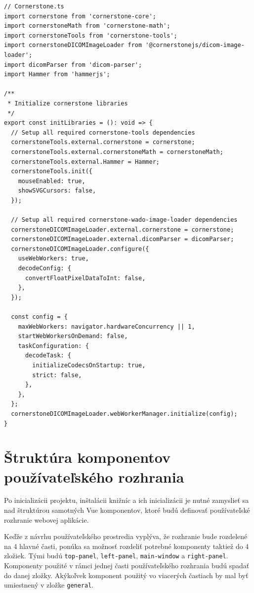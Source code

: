 \begin{minipage}[]{\linewidth}
\begin{verbatim}
// Cornerstone.ts
import cornerstone from 'cornerstone-core';
import cornerstoneMath from 'cornerstone-math';
import cornerstoneTools from 'cornerstone-tools';
import cornerstoneDICOMImageLoader from '@cornerstonejs/dicom-image-loader';
import dicomParser from 'dicom-parser';
import Hammer from 'hammerjs';

/**
 * Initialize cornerstone libraries
 */
export const initLibraries = (): void => {
  // Setup all required cornerstone-tools dependencies
  cornerstoneTools.external.cornerstone = cornerstone;
  cornerstoneTools.external.cornerstoneMath = cornerstoneMath;
  cornerstoneTools.external.Hammer = Hammer;
  cornerstoneTools.init({
    mouseEnabled: true,
    showSVGCursors: false,
  });

  // Setup all required cornerstone-wado-image-loader dependencies
  cornerstoneDICOMImageLoader.external.cornerstone = cornerstone;
  cornerstoneDICOMImageLoader.external.dicomParser = dicomParser;
  cornerstoneDICOMImageLoader.configure({
    useWebWorkers: true,
    decodeConfig: {
      convertFloatPixelDataToInt: false,
    },
  });

  const config = {
    maxWebWorkers: navigator.hardwareConcurrency || 1,
    startWebWorkersOnDemand: false,
    taskConfiguration: {
      decodeTask: {
        initializeCodecsOnStartup: true,
        strict: false,
      },
    },
  };
  cornerstoneDICOMImageLoader.webWorkerManager.initialize(config);
}
\end{verbatim}
\end{minipage}

\section {Štruktúra komponentov používateľského rozhrania}
Po inicializácii projektu, inštalácii knižníc a ich inicializácii je nutné zamyslieť sa nad štruktúrou samotných Vue komponentov, ktoré budú definovať používateľské rozhranie webovej aplikácie.

Keďže z návrhu používateľského prostredia vyplýva, že rozhranie bude rozdelené na 4 hlavné časti, ponúka sa možnosť rozdeliť potrebné komponenty taktiež do 4 zložiek. Tými budú \texttt{top-panel}, \texttt{left-panel}, \texttt{main-window} a \texttt{right-panel}. Komponenty použité v rámci jednej časti používateľského rozhrania budú spadať do danej zložky. Akýkoľvek komponent použitý vo viacerých častiach by mal byť umiestnený v zložke \texttt{general}.

